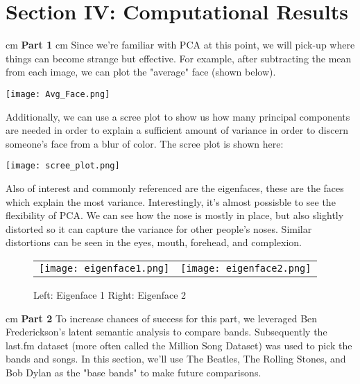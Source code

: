 \documentclass{cup-pan}
\begin{document}
\section{Section IV: Computational Results}

 cm
\noindent
\textbf{Part 1}
 cm
\noindent
Since we're familiar with PCA at this point, we will pick-up where things can become strange but effective.  For example, after subtracting the mean from each image, we can plot the "average" face (shown below). 

\begin{center}
\texttt{[image: Avg\_Face.png]}
\end{center}

\noindent
Additionally, we can use a scree plot to show us how many principal components are needed in order to explain a sufficient amount of variance in order to discern someone's face from a blur of color.  The scree plot is shown here:

\begin{center}
\texttt{[image: scree\_plot.png]}
\end{center}

\noindent
Also of interest and commonly referenced are the eigenfaces, these are the faces which explain the most variance.  Interestingly, it's almost possisble to see the flexibility of PCA.  We can see how the nose is mostly in place, but also slightly distorted so it can capture the variance for other people's noses.  Similar distortions can be seen in the eyes, mouth, forehead, and complexion. 

\begin{center}
\begin{figure}[h]
\begin{tabular}{ll}
\texttt{[image: eigenface1.png]}
&
\texttt{[image: eigenface2.png]}
\end{tabular}
\caption{Left: Eigenface 1 \; \; \; \; \; Right: Eigenface 2}
\label{Fig:Race}
\end{figure}
\end{center}

 cm
\noindent
\textbf{Part 2}
\noindent
To increase chances of success for this part, we leveraged Ben Frederickson's latent semantic analysis to compare bands.  Subsequently the last.fm dataset (more often called the Million Song Dataset) was used to pick the bands and songs. In this section, we'll use The Beatles, The Rolling Stones, and Bob Dylan as the "base bands" to make future comparisons. 
\end{document}
